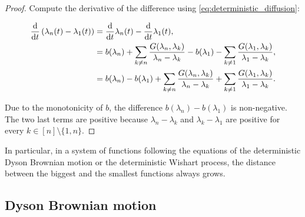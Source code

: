 \begin{proof}
    Compute the derivative of the difference using \eqref{eq:deterministic_diffusion}:

    \begin{align*}
        \frac{\mathrm d}{\mathrm d t}\left( \lambda_n(t) - \lambda_1(t) \right) &= \frac{\mathrm d}{\mathrm d t} \lambda_n(t) - \frac{\mathrm d}{\mathrm d t} \lambda_1 (t),\\
        &= b(\lambda_n) + \sum_{k\neq n} \frac{G(\lambda_n,\lambda_k)}{\lambda_n - \lambda_k} - b(\lambda_1) - \sum_{k\neq 1} \frac{G(\lambda_1,\lambda_k)}{\lambda_1 - \lambda_k},\\
        &= b(\lambda_n) - b(\lambda_1) + \sum_{k\neq n} \frac{G(\lambda_n,\lambda_k)}{\lambda_n - \lambda_k} + \sum_{k\neq 1} \frac{G(\lambda_1,\lambda_k)}{\lambda_1 - \lambda_k}.
    \end{align*}

    Due to the monotonicity of $b$, the difference $b(\lambda_n) - b(\lambda_1)$ is non-negative. The two last terms are positive because $\lambda_n-\lambda_k$ and $\lambda_k-\lambda_1$ are positive for every $k\in [n]\setminus \{1,n\}$.
\end{proof}

In particular, in a system of functions following the equations of the deterministic Dyson Brownian motion or the deterministic Wishart process, the distance between the biggest and the smallest functions always grows.

\subsection{Dyson Brownian motion}





    
